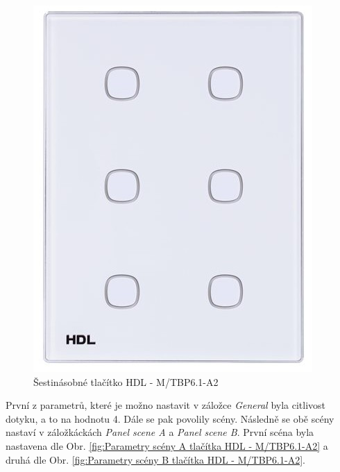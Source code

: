 \begin{figure}[!ht]
  \begin{center}
    \includegraphics[scale=0.25]{obrazky/HDL.jpg}
  \end{center}
  \caption[Šestinásobné tlačítko HDL - M/TBP6.1-A2 \cite{HDL}]{Šestinásobné tlačítko HDL - M/TBP6.1-A2 \cite{HDL}}
  \label{fig:Šestinásobné tlačítko HDL - M/TBP6.1-A2}
\end{figure}

\newpage První z parametrů, které je možno nastavit v záložce \textit{General} byla citlivost dotyku, a to na hodnotu 4. Dále se pak povolily scény. Následně se obě scény nastaví v záložkáckách \textit{Panel scene A} a \textit{Panel scene B}. První scéna byla nastavena dle Obr. \ref{fig:Parametry scény A tlačítka HDL - M/TBP6.1-A2} a druhá dle Obr. \ref{fig:Parametry scény B tlačítka HDL - M/TBP6.1-A2}.

